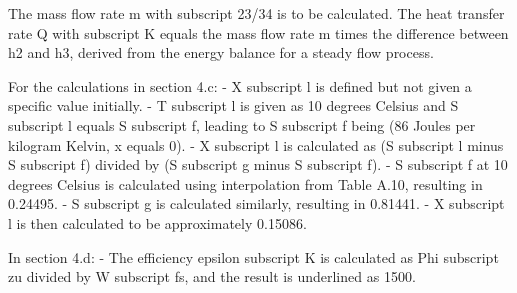 The mass flow rate m with subscript 23/34 is to be calculated. The heat transfer rate Q with subscript K equals the mass flow rate m times the difference between h2 and h3, derived from the energy balance for a steady flow process.

For the calculations in section 4.c:
- X subscript l is defined but not given a specific value initially.
- T subscript l is given as 10 degrees Celsius and S subscript l equals S subscript f, leading to S subscript f being (86 Joules per kilogram Kelvin, x equals 0).
- X subscript l is calculated as (S subscript l minus S subscript f) divided by (S subscript g minus S subscript f).
- S subscript f at 10 degrees Celsius is calculated using interpolation from Table A.10, resulting in 0.24495.
- S subscript g is calculated similarly, resulting in 0.81441.
- X subscript l is then calculated to be approximately 0.15086.

In section 4.d:
- The efficiency epsilon subscript K is calculated as Phi subscript zu divided by W subscript fs, and the result is underlined as 1500.